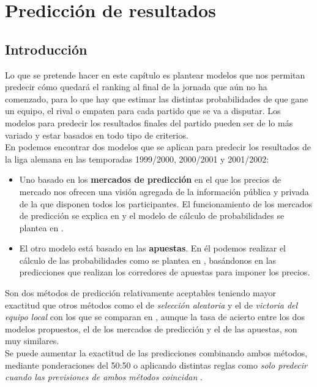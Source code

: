 \chapter{Predicción de resultados}

\section{Introducción}
Lo que se pretende hacer en este capítulo es plantear modelos que nos permitan predecir cómo quedará el ranking al final de la jornada que aún no ha comenzado, para lo que hay que estimar las distintas probabilidades de que gane un equipo, el rival o empaten para cada partido que se va a disputar. Los modelos para predecir los resultados finales del partido pueden ser de lo más variado y estar basados en todo tipo de criterios.\\

En \cite{refpred1} podemos encontrar dos modelos que se aplican para predecir los resultados de la liga alemana en las temporadas 1999/2000, 2000/2001 y 2001/2002:
\begin{itemize}
	\item Uno basado en los \textbf{mercados de predicción} en el que los precios de mercado nos ofrecen una visión agregada de la información pública y privada de la que disponen todos los participantes. El funcionamiento de los mercados de predicción se explica en \cite[Tabla II]{refpred1} y el modelo de cálculo de probabilidades se plantea en \cite[pág 62]{refpred1}.
	\item El otro modelo está basado en las \textbf{apuestas}. En él podemos realizar el cálculo de las probabilidades como se plantea en \cite[págs 62-63]{refpred1}, basándonos en las predicciones que realizan los corredores de apuestas para imponer los precios.
\end{itemize}

Son dos métodos de predicción relativamente aceptables teniendo mayor exactitud que otros métodos como el de \textit{selección aleatoria} y el de \textit{victoria del equipo local} con los que se comparan en \cite[págs 64-66]{refpred1}, aunque la tasa de acierto entre los dos modelos propuestos, el de los mercados de predicción y el de las apuestas, son muy similares.\\
Se puede aumentar la exactitud de las predicciones combinando ambos métodos, mediante ponderaciones del 50:50 o aplicando distintas reglas como \textit{solo predecir cuando las previsiones de ambos métodos coincidan} \cite[págs 66-67]{refpred1}.\\

